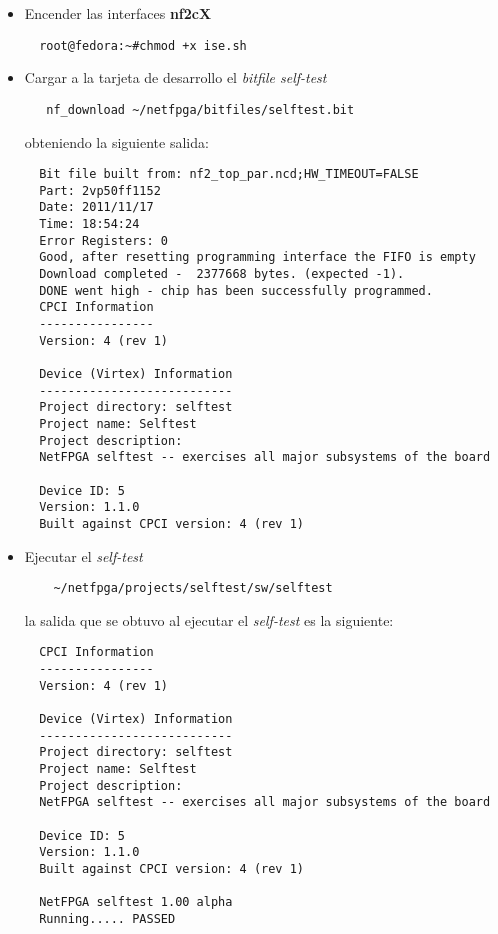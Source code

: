 \begin{itemize}
 \item Encender las interfaces  \textbf{nf2cX}
  \begin{verbatim}
  root@fedora:~#chmod +x ise.sh
  \end{verbatim}
 \item Cargar a la tarjeta de desarrollo el \emph{bitfile self-test}
 \begin{verbatim}
   nf_download ~/netfpga/bitfiles/selftest.bit 
 \end{verbatim}
 obteniendo la siguiente salida:
 \begin{verbatim}
  Bit file built from: nf2_top_par.ncd;HW_TIMEOUT=FALSE
  Part: 2vp50ff1152
  Date: 2011/11/17
  Time: 18:54:24
  Error Registers: 0
  Good, after resetting programming interface the FIFO is empty
  Download completed -  2377668 bytes. (expected -1).
  DONE went high - chip has been successfully programmed.
  CPCI Information
  ----------------
  Version: 4 (rev 1)

  Device (Virtex) Information
  ---------------------------
  Project directory: selftest
  Project name: Selftest
  Project description: 
  NetFPGA selftest -- exercises all major subsystems of the board

  Device ID: 5
  Version: 1.1.0
  Built against CPCI version: 4 (rev 1)
 \end{verbatim}

 \item Ejecutar el \emph{self-test}
 \begin{verbatim}
    ~/netfpga/projects/selftest/sw/selftest 
 \end{verbatim}
 la salida que se obtuvo al ejecutar el   \emph{self-test} es la siguiente:

  \begin{verbatim}
  CPCI Information
  ----------------
  Version: 4 (rev 1)

  Device (Virtex) Information
  ---------------------------
  Project directory: selftest
  Project name: Selftest
  Project description: 
  NetFPGA selftest -- exercises all major subsystems of the board

  Device ID: 5
  Version: 1.1.0
  Built against CPCI version: 4 (rev 1)

  NetFPGA selftest 1.00 alpha
  Running..... PASSED

  \end{verbatim}
\end{itemize}



